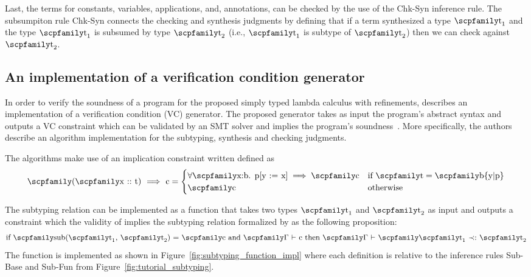 \documentclass[
  oneside,
  english,
  coorientadorbanca,
  noabntexcite
]{ufsc-thesis-rn46-2019}
\newcommand{\code}[1]{\text{\scpfamily\setlength\spaceskip{0.35em}#1}}
\newcommand{\ctxtr}[2]{\code{{$\Gamma$}#1 {$\vdash$} #2}}
\newcommand{\subtyr}[2]{\code{#1 $\prec :$ #2}}
\newcommand{\subtycxr}[3]{\ctxtr{#1}{\subtyr{#2}{#3}}}
\newcommand{\implcons}[3]{\code{$($\code{#1} $::$ #2$)$ $\implies$ #3}}
\begin{document}
Last, the terms for constants, variables, applications, and, annotations, can be checked by the use of the Chk-Syn inference rule.
The subsumpiton rule Chk-Syn connects the checking and synthesis judgments by defining that if a term \code{e} synthesized a type $\code{t}_1$ and the type $\code{t}_1$ is subsumed by type $\code{t}_2$ (i.e., $\code{t}_1$ is subtype of $\code{t}_2$) then we can check \code{e} against $\code{t}_2$.

\subsection{An implementation of a verification condition generator}

In order to verify the soundness of a program for the proposed simply typed lambda calculus with refinements, \textcite{jhala2020tutorial} describes an implementation of a verification condition (VC) generator.
The proposed generator takes as input the program's abstract syntax and outputs a VC constraint \code{c} which can be validated by an SMT solver and implies the program's soundness~\cite{jhala2020tutorial}.
More specifically, the authors describe an algorithm implementation for the subtyping, synthesis and checking judgments.

The algorithms make use of an implication constraint written \implcons{x}{t}{c} defined as
\begin{equation*}
  \implcons{x}{t}{c} = \begin{cases}
    \forall\code{x:b. p[y := x]} \implies \code{c} & \textrm{if \code{t}} = \code{b\{y|p\}} \\
    \code{c}                                       & \textrm{otherwise}
  \end{cases}
\end{equation*}

The subtyping relation can be implemented as a function \code{sub} that takes two types $\code{t}_1$ and $\code{t}_2$ as input and outputs a constraint \code{c} which the validity of \code{c} implies the subtyping relation \subtyr{$\code{t}_1$}{$\code{t}_2$} formalized by \textcite{jhala2020tutorial} as the following proposition:
\begin{equation*}
  \textrm{if \code{sub($\code{t}_1$, $\code{t}_2$)} = \code{c} and \ctxtr{}{c} then \subtycxr{}{$\code{t}_1$}{$\code{t}_2$}}
\end{equation*}
The function \code{sub} is implemented as shown in Figure~\ref{fig:subtyping_function_impl} where each definition is relative to the inference rules Sub-Base and Sub-Fun from Figure~\ref{fig:tutorial_subtyping}.
\end{document}
